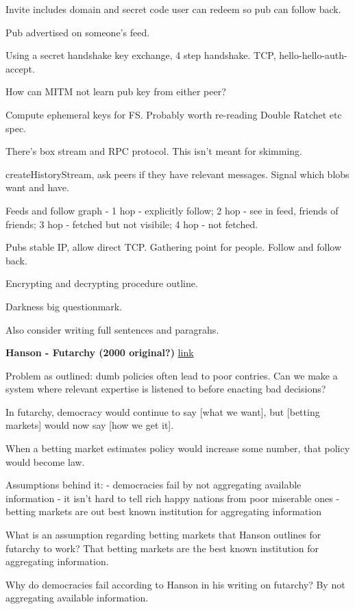 \documentclass[12pt]{report}
\newcommand{\link}[2]{\href{#1}{#2}}
\begin{document}
Invite includes domain and secret code user can redeem so pub can follow back.

Pub advertised on someone's feed.

Using a secret handshake key exchange, 4 step handshake. TCP, hello-hello-auth-accept.

How can MITM not learn pub key from either peer?

Compute ephemeral keys for FS. Probably worth re-reading Double Ratchet etc spec.

There's box stream and RPC protocol. This isn't meant for skimming.

createHistoryStream, ask peers if they have relevant messages. Signal which
blobs want and have.

Feeds and follow graph - 1 hop - explicitly follow; 2 hop - see in feed, friends
of friends; 3 hop - fetched but not visibile; 4 hop - not fetched.

Pubs stable IP, allow direct TCP. Gathering point for people. Follow and follow back.

Encrypting and decrypting procedure outline.

Darkness big questionmark.

Also consider writing full sentences and paragrahs.

\textbf{Hanson - Futarchy (2000 original?)}
\link{http://mason.gmu.edu/~rhanson/futarchy.html}{link}

Problem as outlined: dumb policies often lead to poor contries. Can we make a
system where relevant expertise is listened to before enacting bad decisions?

In futarchy, democracy would continue to say [what we want], but [betting
markets] would now say [how we get it].

When a betting market estimates policy would increase some number, that policy would become law.

Assumptions behind it:
- democracies fail by not aggregating available information
- it isn't hard to tell rich happy nations from poor miserable ones
- betting markets are out best known institution for aggregating information

What is an assumption regarding betting markets that Hanson outlines for futarchy to work?
That betting markets are the best known institution for aggregating information.

Why do democracies fail according to Hanson in his writing on futarchy?
By not aggregating available information.
\end{document}
